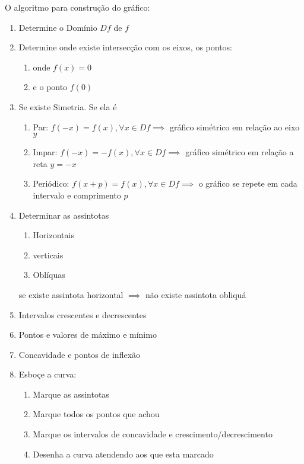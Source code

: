 \begin{method}
    O algoritmo para construção do gráfico:
    \begin{enumerate}
        \item Determine o Domínio \(Df\) de \(f\)
        \item Determine onde existe intersecção com os eixos, os pontos:
            \begin{enumerate}
                \item onde \(f(x) = 0\)
                \item e o ponto \(f(0)\)
            \end{enumerate}
        \item Se existe Simetria.  Se ela é
            \begin{enumerate}
                \item Par: \(f(-x) = f(x), \forall x \in Df \implies\) gráfico simétrico em relação ao eixo \(y\)
                \item Impar: \(f(-x) = -f(x), \forall x \in Df \implies\) gráfico simétrico em relação a reta \(y = -x\)
                \item Periódico: \(f(x + p) = f(x), \forall x \in Df \implies\) o gráfico se repete em cada intervalo e comprimento \(p\) 
            \end{enumerate}
        \item Determinar as assintotas
            \begin{enumerate}
                \item Horizontais
                \item verticais
                \item Oblíquas
            \end{enumerate}
            \begin{remark}
                se existe assintota horizontal \(\implies\) não existe assintota obliquá
            \end{remark}
        \item Intervalos crescentes e decrescentes
        \item Pontos e valores de máximo e mínimo
        \item Concavidade e pontos de inflexão
        \item Esboçe a curva:
            \begin{enumerate}
                \item Marque as assintotas
                \item Marque todos os pontos que achou
                \item Marque os intervalos de concavidade e crescimento/decrescimento
                \item Desenha a curva atendendo aos que esta marcado
            \end{enumerate}
            
    \end{enumerate}
    
    
\end{method}